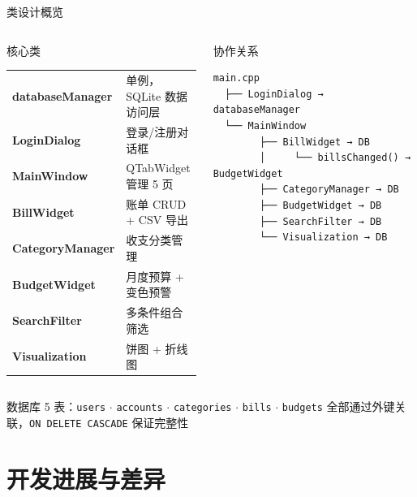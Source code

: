 \documentclass[12pt,aspectratio=169,UTF8]{ctexbeamer}
\begin{document}
\begin{frame}[fragile]{类设计概览}
  \small
  \begin{columns}[t]
    \begin{block}{核心类}
      \begin{tabular}{ll}
        \textbf{databaseManager} & 单例，SQLite 数据访问层 \\
        \textbf{LoginDialog}     & 登录/注册对话框 \\
        \textbf{MainWindow}      & QTabWidget 管理 5 页 \\
        \textbf{BillWidget}      & 账单 CRUD + CSV 导出 \\
        \textbf{CategoryManager} & 收支分类管理 \\
        \textbf{BudgetWidget}    & 月度预算 + 变色预警 \\
        \textbf{SearchFilter}    & 多条件组合筛选 \\
        \textbf{Visualization}   & 饼图 + 折线图 \\
      \end{tabular}
    \end{block}

    \begin{block}{协作关系}
\begin{verbatim}
main.cpp
  ├── LoginDialog → databaseManager
  └── MainWindow
        ├── BillWidget → DB
        │     └── billsChanged() → BudgetWidget
        ├── CategoryManager → DB
        ├── BudgetWidget → DB
        ├── SearchFilter → DB
        └── Visualization → DB
\end{verbatim}
    \end{block}
  \end{columns}

  \vspace{6pt}
  \begin{center}
    \small
    数据库 5 表：\texttt{users} $\cdot$ \texttt{accounts} $\cdot$ \texttt{categories} $\cdot$ \texttt{bills} $\cdot$ \texttt{budgets}
    \quad 全部通过外键关联，\texttt{ON DELETE CASCADE} 保证完整性
  \end{center}
\end{frame}

\section{开发进展与差异}
\end{document}
